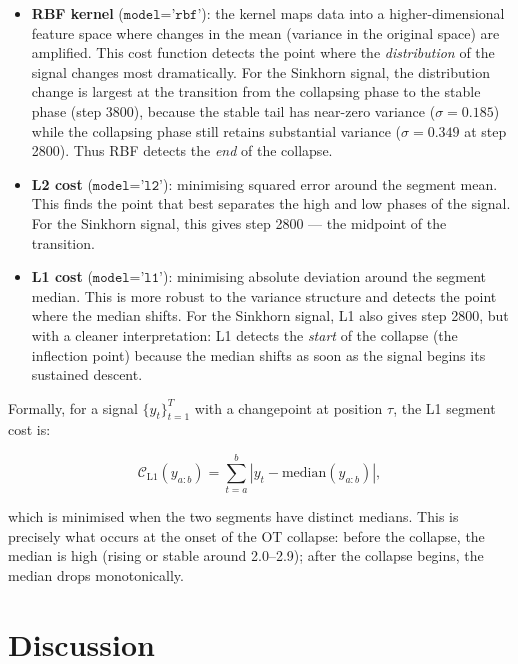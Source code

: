 \documentclass[12pt,twoside]{article}
\begin{document}
\begin{itemize}
  \item \textbf{RBF kernel} (\(\texttt{model='rbf'}\)): the kernel maps data
    into a higher-dimensional feature space where changes in the mean
    (variance in the original space) are amplified. This cost function detects
    the point where the \emph{distribution} of the signal changes most
    dramatically. For the Sinkhorn signal, the distribution change is largest
    at the transition from the collapsing phase to the stable phase (step
    3800), because the stable tail has near-zero variance ($\sigma=0.185$)
    while the collapsing phase still retains substantial variance
    ($\sigma=0.349$ at step 2800). Thus RBF detects the \emph{end} of the
    collapse.
  \item \textbf{L2 cost} (\(\texttt{model='l2'}\)): minimising squared error
    around the segment mean. This finds the point that best separates the
    high and low phases of the signal. For the Sinkhorn signal, this gives
    step 2800 --- the midpoint of the transition.
  \item \textbf{L1 cost} (\(\texttt{model='l1'}\)): minimising absolute
    deviation around the segment median. This is more robust to the variance
    structure and detects the point where the median shifts. For the Sinkhorn
    signal, L1 also gives step 2800, but with a cleaner interpretation: L1
    detects the \emph{start} of the collapse (the inflection point) because
    the median shifts as soon as the signal begins its sustained descent.
\end{itemize}

Formally, for a signal $\{y_t\}_{t=1}^T$ with a changepoint at position
$\tau$, the L1 segment cost is:

\begin{equation}
  \mathcal{C}_{\text{L1}}(y_{a:b}) = \sum_{t=a}^b |y_t - \text{median}(y_{a:b})|,
  \label{eq:l1_cost}
\end{equation}

which is minimised when the two segments have distinct medians. This is
precisely what occurs at the onset of the OT collapse: before the collapse,
the median is high (rising or stable around 2.0--2.9); after the collapse
begins, the median drops monotonically.

\section{Discussion}
\label{sec:discussion}
\end{document}
